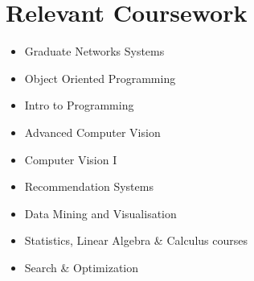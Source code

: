 \documentclass[letterpaper,11pt]{article}
\newcommand{\resumeSubHeadingListStart}{\begin{itemize}[leftmargin=0.0in, label={}]}
\newcommand{\resumeSubHeadingListEnd}{\end{itemize}}
\begin{document}
\section{Relevant Coursework}
        \begin{multicols}{2}
            \begin{itemize}[itemsep=-5pt, parsep=3pt]
                \item Graduate Networks Systems
                \item Object Oriented Programming
                \item Intro to Programming
                \item Advanced Computer Vision
                \item Computer Vision I
                \item Recommendation Systems
                \item Data Mining and Visualisation
                \item Statistics, Linear Algebra \& Calculus courses
                \item Search \& Optimization
            \end{itemize}
        \end{multicols}
        \vspace*{2.0\multicolsep}

    
\end{document}
